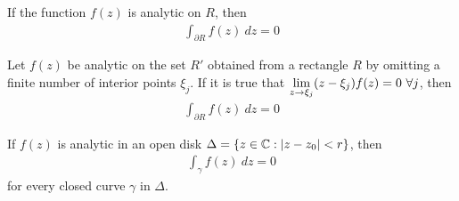 \begin{theorem}
    If the function $f(z)$ is analytic on $R$, then
    \begin{align*}
        \int_{\partial R} f(z) \ dz = 0
    \end{align*}
\end{theorem}

\begin{theorem}
    Let $f(z)$ be analytic on the set $R'$ obtained from a rectangle $R$ by
    omitting a finite number of interior points $\xi_j$. If it is true that
    $\lim\limits_{z \rightarrow \xi_j} (z-\xi_j) f(z) = 0 \ \forall j$, then
    \begin{align*}
        \int_{\partial R} f(z) \ dz = 0
    \end{align*}
\end{theorem}

\begin{theorem}
    If $f(z)$ is analytic in an open disk $\Delta = \left\{ z \in \mathbb{C} :
    \left\vert z - z_0 \right\vert < r \right\}$, then
    \begin{align*}
        \int_\gamma f(z) \ dz = 0
    \end{align*}
    for every closed curve $\gamma$ in $\Delta$.
\end{theorem}

